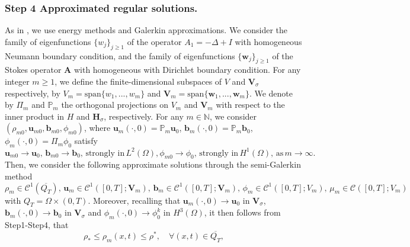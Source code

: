 \documentclass[11pt]{article}
\numberwithin{equation}{section}
\begin{document}
\subsubsection*{Step 4 Approximated regular solutions.}
As in \cite{AR1}, we use energy methods and Galerkin approximations. We consider the family of
eigenfunctions $\{ w_j\}_{j\geq 1}$ of the operator $A_1=-\Delta+I$ with homogeneous Neumann boundary condition,    and the family of eigenfunctions
$\{\boldsymbol{w}_j\}_{j\geq 1}$ of the Stokes operator $\boldsymbol{A}$  with homogeneous with Dirichlet boundary condition.
For any integer $m\geq 1$, we define the finite-dimensional subspaces of $V$ and  $\boldsymbol{V}_\sigma$ respectively, by
$ V_m=\text{span}\{ w_1,...,w_m\} $ and  $\boldsymbol{V}_m= \text{span}\{ \boldsymbol{w}_1,...,\boldsymbol{w}_m\}$.
We denote by $\Pi_m$ and $\mathbb{P}_m$ the orthogonal projections on $V_m$ and $\boldsymbol{V}_m$
with respect to the inner product in $H$ and $\boldsymbol{H}_\sigma$, respectively. %
For any $m\in \mathbb{N}$, we consider $(\rho_{m0},\boldsymbol{u}_{m0}, \boldsymbol{b}_{m0}, \phi_{m0})$, where
$\mathbf{u}_m(\cdot,0)=\mathbb{P}_m\mathbf{u}_0$,
$\mathbf{b}_m(\cdot,0)=\mathbb{P}_m\mathbf{b}_0$,
$\phi_m(\cdot,0)=\Pi_m\phi_0$ satisfy
\begin{equation}\label{4.12A}
\boldsymbol{u}_{m0}\to \mathbf{u}_0,\, \boldsymbol{b}_{m0}\to \mathbf{b}_0, \, \text{strongly in}\,  L^{2}(\Omega), \phi_{m0}\to \phi_{0}, \, \text{strongly in}\,  H^{1}(\Omega), \, \text{as}\,  m\to\infty.
\end{equation}
Then, we consider the following  approximate solutions  through the semi-Galerkin method
 \begin{equation*}
\rho_m\in\mathcal{C}^1(\overline{Q_T}),\, \mathbf{u}_m\in\mathcal{C}^1([0,T];\mathbf{V}_m),\,
\mathbf{b}_m\in\mathcal{C}^1([0,T];\mathbf{V}_m),\,
\phi_m\in\mathcal{C}^1([0,T];V_m),\, \mu_m\in\mathcal{C}([0,T];V_m)
\end{equation*}
with $Q_T = \Omega\times(0,T)$. Moreover, recalling that $\mathbf{u}_m(\cdot,0)\to\mathbf{u}_0$ in $\mathbf{V}_{\sigma}$,
$\mathbf{b}_m(\cdot,0)\to\mathbf{b}_0$ in $\mathbf{V}_{\sigma}$
and $\phi_m(\cdot,0)\to\phi_0^k$ in $H^3(\Omega)$,   it then follows from Step1-Step4, that
\begin{equation}\label{4.8}
\rho_*\leq\rho_m(x,t)\leq\rho^*, \quad \forall (x,t)\in\overline{Q_T},
\end{equation}
\end{document}
